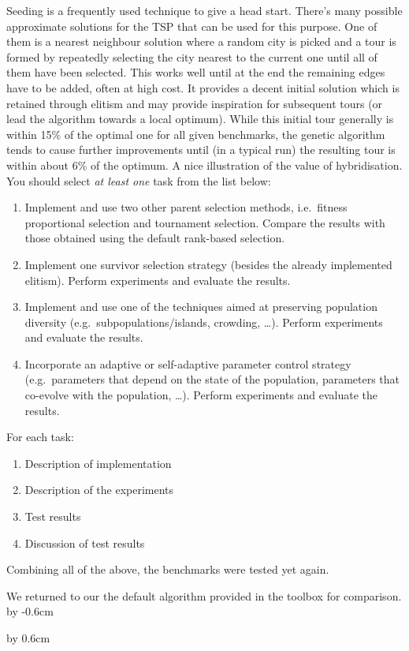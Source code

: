 Seeding is a frequently used technique to give a head start. There's many possible approximate solutions for the TSP that can be used for this purpose. One of them is a nearest neighbour solution where a random city is picked and a tour is formed by repeatedly selecting the city nearest to the current one until all of them have been selected. This works well until at the end the remaining edges have to be added, often at high cost. It provides a decent initial solution which is retained through elitism and may provide inspiration for subsequent tours (or lead the algorithm towards a local optimum). While this initial tour generally is within 15\% of the optimal one for all given benchmarks, the genetic algorithm tends to cause further improvements until (in a typical run) the resulting tour is within about 6\% of the optimum. A nice illustration of the value of hybridisation. \\

You should select \emph{at least one} task from the list below:
{\small
\begin{enumerate}
\item Implement and use two other parent selection methods, i.e.\  fitness proportional selection and tournament selection. Compare the results with those obtained using the default rank-based selection. 
\item Implement one survivor selection strategy (besides the already implemented elitism). Perform experiments and evaluate the results. 
\item Implement and use one of the techniques aimed at preserving population diversity (e.g.\ subpopulations/islands, crowding, \ldots). Perform experiments and evaluate the results.
\item Incorporate an adaptive or self-adaptive parameter control strategy (e.g.\  parameters that depend on the state of the population, parameters that co-evolve with the population, \ldots). Perform experiments and evaluate the results. 
\end{enumerate}
}

\noindent
For each task:
\begin{enumerate}
\item	 Description of implementation
\item	 Description of the experiments
\item Test results
\item Discussion of test results
\end{enumerate}


Combining all of the above, the benchmarks were tested yet again.\\

\par\noindent We returned to our the default algorithm provided in the toolbox for comparison. \\

\advance\voffset by -0.6cm

\advance\voffset by 0.6cm



